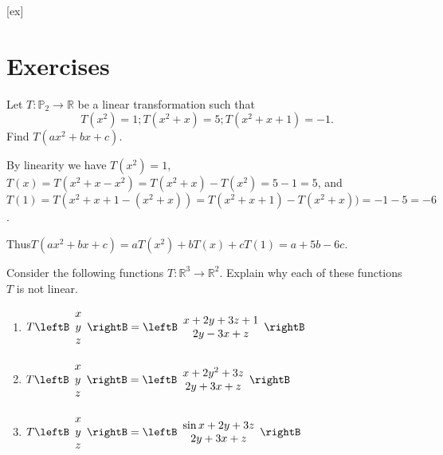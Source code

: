 [ex]
\section*{Exercises}

\begin{enumialphparenastyle}

\begin{ex} 
Let $T:\mathbb{P}_2 \to \mathbb{R}$ be a linear transformation such that
\[ T(x^2)=1; T(x^2+x)=5; T(x^2+x+1)=-1.\]
Find $T(ax^2+bx+c)$.
\begin{sol}
By linearity we have 
$T(x^2)=1$, $T(x) = T(x^2+x - x^2)= T(x^2+x) - T(x^2)= 5-1=5$, and 
$T(1) = T(x^2+x+1 -(x^2+x))=T(x^2+x+1) -T(x^2+x))= -1-5=-6$. 

Thus$T(ax^2+bx+c) = aT(x^2) + bT(x) + cT(1) = a+5b-6c$. 
\end{sol}
\end{ex}

\begin{ex} Consider the following functions $T:\mathbb{R}^{3}\rightarrow \mathbb{R}^{2}.$
Explain why each of these functions $T$ is not linear.

\begin{enumerate}
\item $T\leftB
\begin{array}{c}
x \\
y \\
z
\end{array}
\rightB =\leftB
\begin{array}{c}
x+2y+3z+1 \\
2y-3x+z
\end{array}
\rightB $

\item $T\leftB
\begin{array}{c}
x \\
y \\
z
\end{array}
\rightB =\leftB
\begin{array}{c}
x+2y^{2}+3z \\
2y+3x+z
\end{array}
\rightB $

\item $T\leftB
\begin{array}{c}
x \\
y \\
z
\end{array}
\rightB =\leftB
\begin{array}{c}
\sin x+2y+3z \\
2y+3x+z
\end{array}
\rightB $


\end{enumerate}
\end{ex}
\end{enumialphparenastyle}
